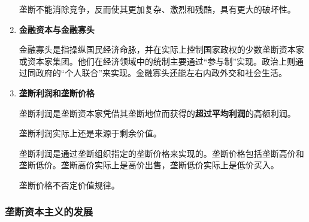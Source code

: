 \documentclass[12pt, a4paper, oneside]{ctexart}
\begin{document}
\begin{enumerate}
  垄断不能消除竞争，反而使其更加复杂、激烈和残酷，具有更大的破坏性。

  \item {\bf 金融资本与金融寡头}
  
  金融寡头是指操纵国民经济命脉，并在实际上控制国家政权的少数垄断资本家或资本家集团。他们在经济领域中的统制主要通过“参与制”实现。政治上则通过同政府的“个人联合”来实现。金融寡头还能左右内政外交和社会生活。

  \item {\bf 垄断利润和垄断价格}
  
  垄断利润是垄断资本家凭借其垄断地位而获得的\textbf{超过平均利润}的高额利润。

  垄断利润实际上还是来源于剩余价值。

  垄断利润是通过垄断组织指定的垄断价格来实现的。垄断价格包括垄断高价和垄断低价。垄断高价实际上是高价出售，垄断低价实际上是低价买入。

  垄断价格不否定价值规律。

\end{enumerate}

\subsubsection{垄断资本主义的发展}
\end{document}
